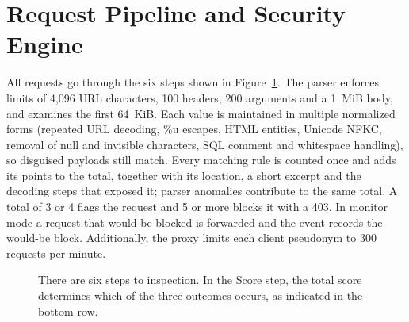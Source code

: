 \documentclass{FastFyp}
\begin{document}
\section{Request Pipeline and Security Engine}
All requests go through the six steps shown in Figure~\ref{fig:pipeline}. The parser enforces limits of 4,096 URL characters, 100 headers, 200 arguments and a 1~MiB body, and examines the first 64~KiB. Each value is maintained in multiple normalized forms (repeated URL decoding, \%u escapes, HTML entities, Unicode NFKC, removal of null and invisible characters, SQL comment and whitespace handling), so disguised payloads still match. Every matching rule is counted once and adds its points to the total, together with its location, a short excerpt and the decoding steps that exposed it; parser anomalies contribute to the same total. A total of 3 or 4 flags the request and 5 or more blocks it with a 403. In monitor mode a request that would be blocked is forwarded and the event records the would-be block. Additionally, the proxy limits each client pseudonym to 300 requests per minute.

\begin{figure}[!htb]
\centering
{}
\caption{There are six steps to inspection. In the Score step, the total score determines which of the three outcomes occurs, as indicated in the bottom row.}
\label{fig:pipeline}
\end{figure}
\end{document}
